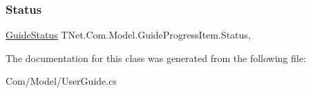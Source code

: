 \mbox{\label{class_t_net_1_1_com_1_1_model_1_1_guide_progress_item_aa0e0c51fb001e23629a168f800706d77}} 
\subsubsection{\texorpdfstring{Status}{Status}}
{\footnotesize\ttfamily \mbox{\hyperlink{namespace_t_net_1_1_com_1_1_model_a707db44f1e497fe59e8085ae6892a50d}{Guide\+Status}} T\+Net.\+Com.\+Model.\+Guide\+Progress\+Item.\+Status\hspace{0.3cm}{\ttfamily [get]}, {\ttfamily [set]}}







The documentation for this class was generated from the following file\+:\begin{DoxyCompactItemize}
\item 
Com/\+Model/User\+Guide.\+cs\end{DoxyCompactItemize}
